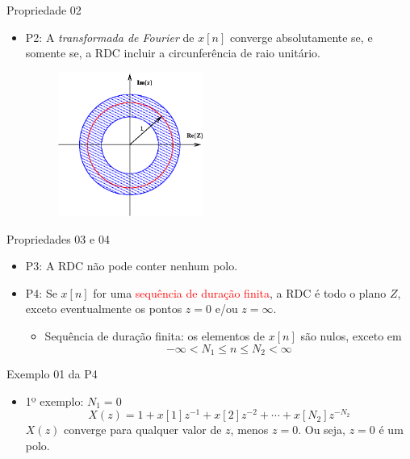 \begin{slide}{Propriedade 02}
\begin{itemize}
   \item P2: A \emph{transformada de Fourier} de $x[n]$ converge absolutamente se, e somente se, a RDC incluir a circunferência de raio unitário.
   \begin{figure}
      \centering
      \includegraphics[width=0.45\textwidth]{figs/p2.eps}
   \end{figure}
\end{itemize}
\end{slide}

\begin{slide}{Propriedades 03 e 04}
\begin{itemize}
   \item P3: A RDC não pode conter nenhum polo.
   \item P4: Se $x[n]$ for uma \textcolor{red}{sequência de duração finita}, a RDC é todo o plano $Z$, exceto eventualmente os pontos $z=0$ e/ou $z=\infty$.
   \begin{itemize}
      \item Sequência de duração finita: os elementos de $x[n]$ são nulos, exceto em \begin{equation*} -\infty < N_1 \leq n \leq N_2 < \infty\end{equation*}
   \end{itemize} 
\end{itemize}
\end{slide}

\begin{slide}{Exemplo 01 da P4}
   \begin{itemize}
      \item 1º exemplo: $N_1=0$ \begin{equation*}X(z) = 1+x[1]z^{-1}+x[2]z^{-2}+ \cdots +x[N_2]z^{-N_2}\end{equation*}
   $X(z)$ converge para qualquer valor de $z$, menos $z=0$. Ou seja, $z =0$ é um polo.
   \end{itemize} 
\end{slide}

